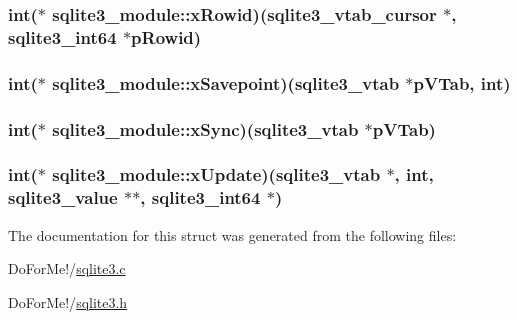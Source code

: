 \hypertarget{structsqlite3__module_a1e119b28bd3ad706d1982aaa938aac79}{
\subsubsection[{x\-Rowid}]{\setlength{\rightskip}{0pt plus 5cm}int($\ast$ sqlite3\-\_\-module\-::x\-Rowid)({\bf sqlite3\-\_\-vtab\-\_\-cursor} $\ast$, {\bf sqlite3\-\_\-int64} $\ast$p\-Rowid)}}\label{structsqlite3__module_a1e119b28bd3ad706d1982aaa938aac79}
\hypertarget{structsqlite3__module_af90f1df803fce1b90048864aeeeee890}{
\subsubsection[{x\-Savepoint}]{\setlength{\rightskip}{0pt plus 5cm}int($\ast$ sqlite3\-\_\-module\-::x\-Savepoint)({\bf sqlite3\-\_\-vtab} $\ast$p\-V\-Tab, int)}}\label{structsqlite3__module_af90f1df803fce1b90048864aeeeee890}
\hypertarget{structsqlite3__module_a895d78529db2e28e13d1d842512770b6}{
\subsubsection[{x\-Sync}]{\setlength{\rightskip}{0pt plus 5cm}int($\ast$ sqlite3\-\_\-module\-::x\-Sync)({\bf sqlite3\-\_\-vtab} $\ast$p\-V\-Tab)}}\label{structsqlite3__module_a895d78529db2e28e13d1d842512770b6}
\hypertarget{structsqlite3__module_a029d0713dbb3c847a6de773a0a179605}{
\subsubsection[{x\-Update}]{\setlength{\rightskip}{0pt plus 5cm}int($\ast$ sqlite3\-\_\-module\-::x\-Update)({\bf sqlite3\-\_\-vtab} $\ast$, int, {\bf sqlite3\-\_\-value} $\ast$$\ast$, {\bf sqlite3\-\_\-int64} $\ast$)}}\label{structsqlite3__module_a029d0713dbb3c847a6de773a0a179605}


The documentation for this struct was generated from the following files\-:\begin{DoxyCompactItemize}
\item 
Do\-For\-Me!/\hyperlink{sqlite3_8c}{sqlite3.\-c}\item 
Do\-For\-Me!/\hyperlink{sqlite3_8h}{sqlite3.\-h}\end{DoxyCompactItemize}
